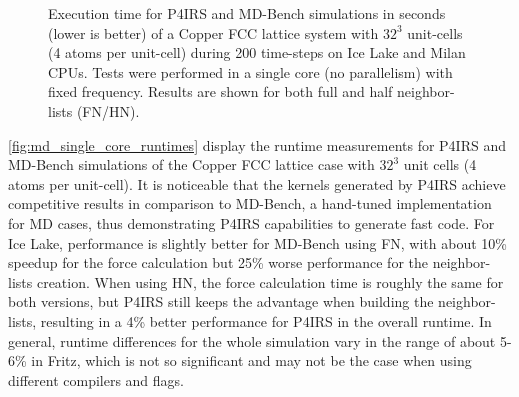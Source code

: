 \documentclass[Afour,sageh,times]{sagej}
\begin{document}
\begin{figure}[t]
\vspace{-3ex}
	\caption{Execution time for P4IRS and MD-Bench simulations in seconds (lower is better) of a Copper FCC lattice system with $32^{3}$ unit-cells (4 atoms per unit-cell) during 200 time-steps on Ice Lake and Milan CPUs. Tests were performed in a single core (no parallelism) with fixed frequency. Results are shown for both full and half neighbor-lists (FN/HN).}
\vspace{-2ex}
\centering
\label{fig:md_single_core_runtimes}
\end{figure}

\autoref{fig:md_single_core_runtimes} display the runtime measurements for P4IRS and MD-Bench simulations of the Copper FCC lattice case with $32^{3}$ unit cells (4 atoms per unit-cell).
It is noticeable that the kernels generated by P4IRS achieve competitive results in comparison to MD-Bench, a hand-tuned implementation for MD cases, thus demonstrating P4IRS capabilities to generate fast code.
For Ice Lake, performance is slightly better for MD-Bench using \ac{FN}, with about 10\% speedup for the force calculation but 25\% worse performance for the neighbor-lists creation.
When using \ac{HN}, the force calculation time is roughly the same for both versions, but P4IRS still keeps the advantage when building the neighbor-lists, resulting in a 4\% better performance for P4IRS in the overall runtime.
In general, runtime differences for the whole simulation vary in the range of about 5-6\% in Fritz, which is not so significant and may not be the case when using different compilers and flags.
\end{document}
